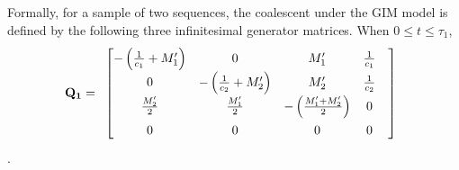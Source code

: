 \documentclass[11pt]{article}
\begin{document}
Formally, for a sample of two sequences, the coalescent under the GIM model is defined 
by the following three infinitesimal generator matrices. When $0 \leq t \leq \tau_{1}$,
\begin{equation}
\label{matrix:Q1}
\renewcommand{\arraystretch}{1.5}
\mathbf{Q_{1}}=\begin{array}{c}
\begin{bmatrix}
				-\left(\frac{1}{c_{1}}+M'_{1}\right) & 0 & M'_{1} & \frac{1}{c_{1}} & \\
			          0 & -\left(\frac{1}{c_{2}}+M'_{2}\right) & M'_{2} & \frac{1}{c_{2}} & \\
				\frac{M'_{2}}{2} & \frac{M'_{1}}{2} & -\left(\frac{M'_{1}+M'_{2}}{2}\right) & 0 &\\
			          0 & 0 & 0 & 0 &
\end{bmatrix}
\end{array}
\end{equation} 
\citep{Takahata1988,Notohara1990,Herbots1997,Kozakai2016}.
\end{document}
